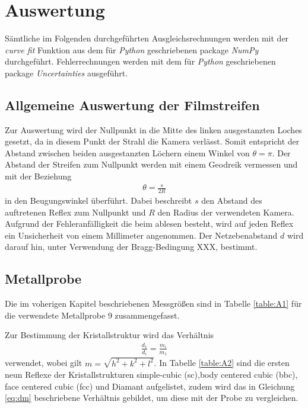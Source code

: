 \section{Auswertung}
\label{sec:Auswertung}
Sämtliche im Folgenden durchgeführten Ausgleichsrechnungen werden mit der \emph{curve fit} Funktion aus dem für \emph{Python} geschriebenen package \emph{NumPy}\cite{scipy} durchgeführt. Fehlerrechnungen werden mit dem für \emph{Python} geschriebenen package \emph{Uncertainties}\cite{uncertainties} ausgeführt.

\subsection{Allgemeine Auswertung der Filmstreifen}
\label{sec:allgemein}
Zur Auswertung wird der Nullpunkt in die Mitte des linken ausgestanzten Loches gesetzt, da in diesem Punkt der Strahl die Kamera verlässt. Somit entspricht der Abstand zwischen beiden ausgestanzten Löchern einem Winkel von $\theta=\pi$. Der Abstand der Streifen zum Nullpunkt werden mit einem Geodreik vermessen und mit der Beziehung
\begin{align}
	\theta=\frac{s}{2R}
\end{align}
in den Beugungswinkel überführt. Dabei beschreibt $s$ den Abstand des auftretenen Reflex zum Nullpunkt und $R$ den Radius der verwendeten Kamera.  Aufgrund der Fehleranfälligkeit die beim ablesen besteht, wird auf jeden Reflex ein Unsicherheit von einem Millimeter angenommen. 
Der Netzebenabstand $d$ wird darauf hin, unter Verwendung der Bragg-Bedingung XXX, bestimmt.

\subsection{Metallprobe}
Die im voherigen Kapitel beschriebenen Messgrößen sind in Tabelle \ref{table:A1} für die verwendete Metallprobe 9 zusammengefasst.



Zur Bestimmung der Kristallstruktur wird das Verhältnis
\begin{align}
	\frac{d_1}{d_i}=\frac{m_i}{m_1}
	\label{eq:dm}
\end{align} 
verwendet, wobei gilt $m=\sqrt{h^2+k^2+l^2}$.
In Tabelle \ref{table:A2} sind die ersten neun Reflexe der Kristallstrukturen simple-cubic (sc),body centered cubic (bbc), face centered cubic (fcc) und Diamant aufgelistet, zudem wird das in Gleichung \ref{eq:dm} beschriebene Verhältnis gebildet, um diese mit der Probe zu vergleichen.


